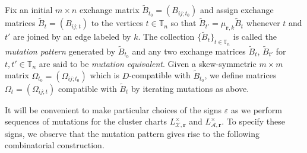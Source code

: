 \documentclass{amsart}
\numberwithin{equation}{section}
\newcommand{\bfr}{{\boldsymbol{r}}}
\newcommand{\cA}{\mathcal{A}}
\newcommand{\cX}{\mathcal{X}}
\newcommand{\TT}{\mathbb{T}}
\begin{document}
Fix an initial $m\times n$ exchange matrix $\tilde B_{t_0}=(B_{ij;t_0})$ and assign exchange matrices $\tilde B_t=(B_{ij;t})$ to the vertices $t\in\TT_n$ so that $\tilde B_{t'}=\mu_{\bfr,k}\tilde B_t$ whenever $t$ and $t'$ are joined by an edge labeled by $k$.
The collection $\{\tilde B_t\}_{t\in\TT_n}$ is called the \emph{mutation pattern} generated by $\tilde B_{t_0}$ and any two exchange matrices $\tilde B_t$, $\tilde B_{t'}$ for $t,t'\in\TT_n$ are said to be \emph{mutation equivalent}.
Given a skew-symmetric $m\times m$ matrix $\Omega_{t_0}=(\Omega_{ij;t_0})$ which is $D$-compatible with $\tilde B_{t_0}$, we define matrices $\Omega_t=(\Omega_{ij;t})$ compatible with $\tilde B_t$ by iterating mutations as above.

It will be convenient to make particular choices of the signs $\varepsilon$ as we perform sequences of mutations for the cluster charts $L^\times_{\cX,\bfr}$ and $L^\times_{\cA,\bfr}$.
To specify these signs, we observe that the mutation pattern gives rise to the following combinatorial construction.
\end{document}
